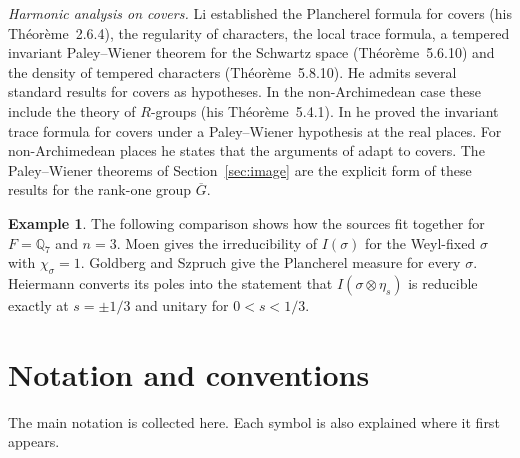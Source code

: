 \documentclass[12pt,letterpaper]{article}
\numberwithin{equation}{section}
\theoremstyle{definition}
\newtheorem{xexample}[theorem]{Example}
\newcommand{\Q}{\mathbb Q}
\newcommand{\bG}{\overline{G}}
\begin{document}
\emph{Harmonic analysis on covers.}  Li \cite{Li12} established the Plancherel formula
for covers (his Th\'eor\`eme~2.6.4), the regularity of characters, the local trace formula,
a tempered invariant Paley--Wiener theorem for the Schwartz space (Th\'eor\`eme~5.6.10)
and the density of tempered characters (Th\'eor\`eme~5.8.10).  He admits several standard
results for covers as hypotheses.  In the non-Archimedean case these include the theory of
$R$-groups (his Th\'eor\`eme~5.4.1).  In \cite{Li14} he proved the invariant trace formula
for covers under a Paley--Wiener hypothesis at the real places.  For non-Archimedean
places he states that the arguments of \cite{BDK86} adapt to covers.  The Paley--Wiener
theorems of Section~\ref{sec:image} are the explicit form of these results for the rank-one
group $\bG$.

\begin{xexample}\label{ex:lit}
The following comparison shows how the sources fit together for $F=\Q_7$ and $n=3$.
Moen \cite{Mo88} gives the irreducibility of $I(\sigma)$ for the Weyl-fixed $\sigma$ with
$\chi_\sigma=1$.  Goldberg and Szpruch \cite{GS16} give the Plancherel measure for every
$\sigma$.  Heiermann \cite{He25} converts its poles into the statement that
$I(\sigma\otimes\eta_s)$ is reducible exactly at $s=\pm1/3$ and unitary for $0<s<1/3$.
\end{xexample}

\section*{Notation and conventions}

The main notation is collected here.  Each symbol is also explained where it first appears.
\end{document}
